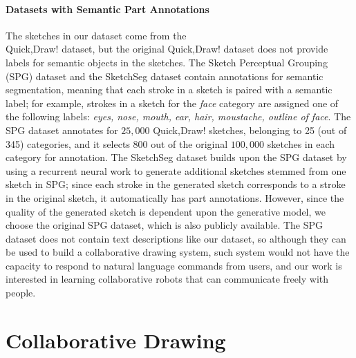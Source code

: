\paragraph{Datasets with Semantic Part Annotations}
The sketches in our dataset come from the \\
Quick,Draw! dataset, but the original Quick,Draw! dataset does not provide labels for semantic objects in the sketches. 
The Sketch Perceptual Grouping (SPG) dataset \citep{spg_paper} and the SketchSeg dataset \citep{sketchsegDataset} contain annotations for semantic segmentation, meaning that each stroke in a sketch is paired with a semantic label; for example, strokes in a sketch for the \textit{face} category are assigned one of the following labels: \textit{eyes, nose, mouth, ear, hair, moustache, outline of face}. 
The SPG dataset annotates for $25,000$ Quick,Draw! sketches, belonging to 25 (out of 345) categories, and it selects 800 out of the original $100,000$ sketches in each category for annotation. 
The SketchSeg dataset builds upon the SPG dataset by using a recurrent neural work to generate additional sketches stemmed from one sketch in SPG; since each stroke in the generated sketch corresponds to a stroke in the original sketch, it automatically has part annotations. However, since the quality of the generated sketch is dependent upon the generative model, we choose the original SPG dataset, which is also publicly available. The SPG dataset does not contain text descriptions like our dataset, so although they can be used to build a collaborative drawing system, such system would not have the capacity to respond to natural language commands from users, and our work is interested in learning collaborative robots that can communicate freely with people.    

\section{Collaborative Drawing}

